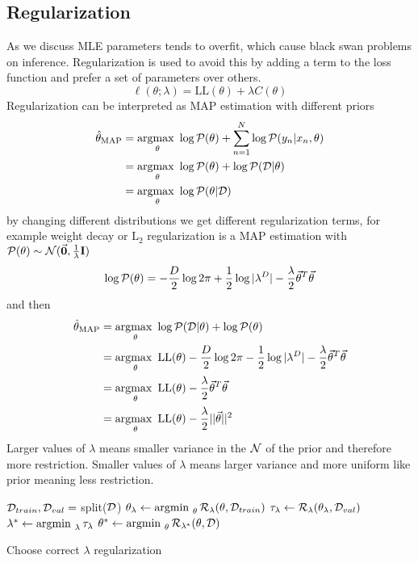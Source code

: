 \documentclass[../main.tex]{subfiles}
\begin{document}
\subsection{Regularization}
As we discuss MLE parameters tends to overfit, which cause black swan problems on inference. Regularization is used to avoid this by adding a term to the loss function and prefer a set of parameters over others.
\begin{equation*}
    \ell(\theta;\lambda) = \mathrm{LL}(\theta) + \lambda C(\theta)
\end{equation*}
Regularization can be interpreted as MAP estimation with different priors
\begin{align*}
    \hat{\theta}_{\mathrm{MAP}} &= \operatorname*{argmax\text{ }}_\theta \log\mathcal{P}(\theta) +\sum_{n=1}^N \log\mathcal{P}(y_n|x_n,\theta)\\
    &= \operatorname*{argmax\text{ }}_\theta \log\mathcal{P}(\theta) + \log\mathcal{P}(\mathcal{D}|\theta)\\
    &= \operatorname*{argmax\text{ }}_\theta \log\mathcal{P}(\theta|\mathcal{D})
\end{align*}
by changing different distributions we get different regularization terms, for example weight decay or $\mathrm{L}_2$ regularization is a MAP estimation with $\p(\theta)\sim \normal(\vec{0},\frac{1}{\lambda}\mat{I})$
\begin{equation*}
    \log\p(\theta) = -\frac{D}{2}\log 2\pi + \frac{1}{2}\log |\lambda^D|- \frac{\lambda}{2}\vec{\theta}^T\vec{\theta}
\end{equation*}
and then
\begin{align*}
    \hat{\theta}_{\mathrm{MAP}}
    &= \argmax_\theta \log\p(\D|\theta)+\log\p(\theta)\\
    &= \argmax_\theta \mathrm{LL}(\theta) -\frac{D}{2}\log 2\pi - \frac{1}{2}\log |\lambda^D|- \frac{\lambda}{2}\vec{\theta}^T\vec{\theta}\\
    &= \argmax_\theta \mathrm{LL}(\theta) - \frac{\lambda}{2}\vec{\theta}^T\vec{\theta}\\
    &= \argmax_\theta \mathrm{LL}(\theta) - \frac{\lambda}{2}||\vec{\theta}||^2\\
\end{align*}
Larger values of $\lambda$ means smaller variance in the $\mathcal{N}$ of the prior and therefore more restriction. Smaller values of $\lambda$ means larger variance and more uniform like prior meaning less restriction.

\begin{algorithm}[H]
\begin{algorithmic}
\State $\mathcal{D}_{train}, \mathcal{D}_{val}=$ split($\mathcal{D}$)
\For{$\lambda \in \Lambda$}
    \State $\theta_\lambda \leftarrow \operatorname*{argmin\text{ }}_\theta \mathcal{R}_\lambda(\theta,\mathcal{D}_{train})$
    \State $\tau_\lambda \leftarrow \mathcal{R}_\lambda(\theta_\lambda,\mathcal{D}_{val}) $
\EndFor
\State $\lambda^* \leftarrow \operatorname*{argmin\text{ }}_\lambda \tau_{\lambda}$
\State $\theta^* \leftarrow \operatorname*{argmin\text{ }}_\theta \mathcal{R}_{\lambda^*}(\theta,\mathcal{D})$
\end{algorithmic}
\caption{Choose correct $\lambda$ regularization}
\end{algorithm}
\end{document}
